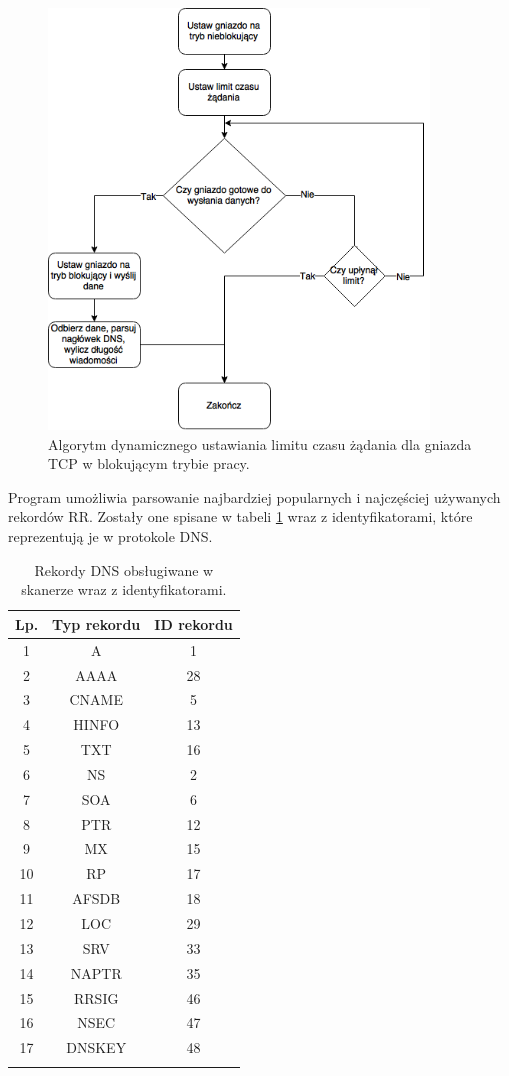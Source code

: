 \begin{figure}[h!]
	\centering
	\includegraphics[width=0.9\textwidth]{image/socketAlg}
	\caption{Algorytm dynamicznego ustawiania limitu czasu żądania dla gniazda TCP w blokującym trybie pracy.}
	\label{fig:socketAlg}
\end{figure}

Program umożliwia parsowanie najbardziej popularnych i najczęściej używanych rekordów RR. Zostały one spisane w tabeli \ref{records}
wraz z identyfikatorami, które reprezentują je w protokole DNS.
\newpage
\begin{longtable}{|c|c|c|}
	\hline
	\textbf{Lp.} &
	\textbf{Typ rekordu} &
	\textbf{ID rekordu} \\ \hline\hline
	1 & A & 1 \\
	2 & AAAA & 28 \\
    3 & CNAME & 5 \\
	4 & HINFO & 13 \\
	5 & TXT & 16 \\
	6 & NS & 2 \\
	7 & SOA & 6 \\
	8 & PTR & 12 \\
	9 & MX & 15 \\
	10 & RP & 17 \\
	11 & AFSDB & 18 \\
	12 & LOC & 29 \\
	13 & SRV & 33 \\
	14 & NAPTR & 35 \\
	15 & RRSIG & 46 \\
	16 & NSEC & 47 \\
	17 & DNSKEY & 48 \\
	\hline
	\caption{Rekordy DNS obsługiwane w skanerze wraz z identyfikatorami.}
	\label{records}
\end{longtable}

